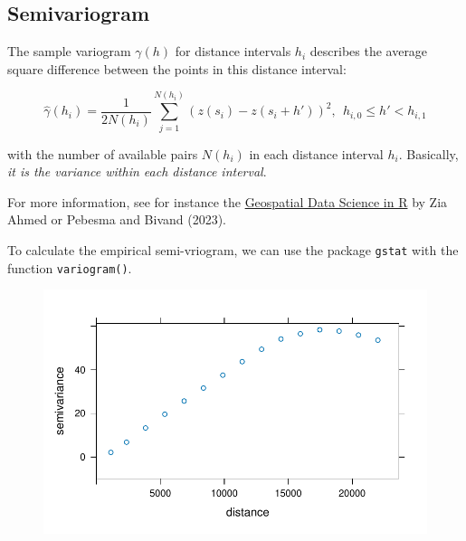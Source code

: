 \documentclass[
  letterpaper,
]{scrbook}
\newenvironment{Shaded}{\begin{snugshade}}{\end{snugshade}}
\newcommand{\AttributeTok}[1]{\textcolor[rgb]{0.40,0.45,0.13}{#1}}
\newcommand{\CommentTok}[1]{\textcolor[rgb]{0.37,0.37,0.37}{#1}}
\newcommand{\DecValTok}[1]{\textcolor[rgb]{0.68,0.00,0.00}{#1}}
\newcommand{\FloatTok}[1]{\textcolor[rgb]{0.68,0.00,0.00}{#1}}
\newcommand{\FunctionTok}[1]{\textcolor[rgb]{0.28,0.35,0.67}{#1}}
\newcommand{\NormalTok}[1]{\textcolor[rgb]{0.00,0.23,0.31}{#1}}
\newcommand{\OtherTok}[1]{\textcolor[rgb]{0.00,0.23,0.31}{#1}}
\newcommand{\SpecialCharTok}[1]{\textcolor[rgb]{0.37,0.37,0.37}{#1}}
\begin{document}
\hypertarget{semivariogram}{%
\subsection{Semivariogram}\label{semivariogram}}

The sample variogram \(\gamma(h)\) for distance intervals \(h_i\)
describes the average square difference between the points in this
distance interval:

\[
\hat{\gamma}(h_i) = \frac{1}{2N(h_i)}\sum_{j=1}^{N(h_i)}(z(s_i)-z(s_i+h'))^2, \ \ h_{i,0} \le h' < h_{i,1}
\]

with the number of available pairs \(N(h_i)\) in each distance interval
\(h_i\). Basically, \emph{it is the variance within each distance
interval}.

For more information, see for instance the
\href{https://zia207.github.io/geospatial-r-github.io/semivariogram-modeling.html}{Geospatial
Data Science in R} by Zia Ahmed or Pebesma and Bivand (2023).

To calculate the empirical semi-vriogram, we can use the package
\texttt{gstat} with the function \texttt{variogram()}.

\begin{Shaded}
\end{Shaded}

\begin{figure}[H]

{\centering \includegraphics{04_dependence_files/figure-pdf/unnamed-chunk-10-1.pdf}

}

\end{figure}
\end{document}
